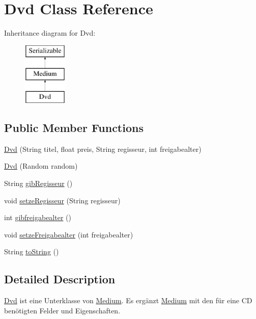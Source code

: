 \hypertarget{classDvd}{\section{Dvd Class Reference}
\label{classDvd}
}
Inheritance diagram for Dvd\-:\begin{figure}[H]
\begin{center}
\leavevmode
\includegraphics[height=3.000000cm]{classDvd}
\end{center}
\end{figure}
\subsection*{Public Member Functions}
\begin{DoxyCompactItemize}
\item 
\hyperlink{classDvd_a2d6d1fe33da6d6039f8cf8baee463291}{Dvd} (String titel, float preis, String regisseur, int freigabealter)
\item 
\hyperlink{classDvd_adb3ad96714865b09806c44e1538e5bf3}{Dvd} (Random random)
\item 
String \hyperlink{classDvd_a02b2a8ad9958fa39915f348811c84297}{gib\-Regisseur} ()
\item 
void \hyperlink{classDvd_a408943b8938726987c765ac9f472372c}{setze\-Regisseur} (String regisseur)
\item 
int \hyperlink{classDvd_a5a7c06f2d979fa7c092936ca429fa361}{gibfreigabealter} ()
\item 
void \hyperlink{classDvd_ac452a14d1d14f1b28d3b19f7b6532270}{setze\-Freigabealter} (int freigabealter)
\item 
String \hyperlink{classDvd_a646f663f014244c28ced8a20c6b0c49c}{to\-String} ()
\end{DoxyCompactItemize}


\subsection{Detailed Description}
\hyperlink{classDvd}{Dvd} ist eine Unterklasse von \hyperlink{classMedium}{Medium}. Es ergänzt \hyperlink{classMedium}{Medium} mit den für eine C\-D benötigten Felder und Eigenschaften.

